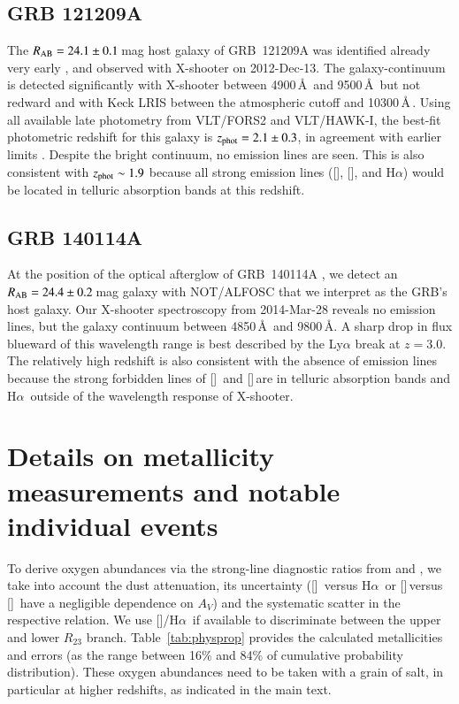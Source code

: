 \documentclass[traditabstract, longauth]{aa}
\newcommand{\ha}{H$\alpha$}
\newcommand{\oii}{[\ion{O}{ii}]}
\newcommand{\oiii}{[\ion{O}{iii}]}
\newcommand{\neiii}{[\ion{Ne}{iii}]}
\newcommand{\nii}{[\ion{N}{ii}]}
\begin{document}
\begin{appendix}
\subsection{GRB 121209A}

The $R_{\rm{AB}}=24.1\pm0.1$\,mag host galaxy of GRB~121209A \citep{2012GCN..14045...1M} was identified already very early \citep{2012GCN..14049...1K, 2012GCN..14056...1P}, and observed with X-shooter on 2012-Dec-13. The galaxy-continuum is detected significantly with X-shooter between 4900\,\AA\, and 9500\,\AA\, but not redward and with Keck LRIS between the atmospheric cutoff and 10300\,\AA\,\citep{2012GCN..14056...1P}. Using all available late photometry from VLT/FORS2 and VLT/HAWK-I, the best-fit photometric redshift for this galaxy is $z_{\rm{phot}} = 2.1\pm0.3$, in agreement with earlier limits \citep{2012GCN..14056...1P}. Despite the bright continuum, no emission lines are seen. This is also consistent with $z_{\rm{phot}}\sim1.9$ because all strong emission lines (\oiii, \oii, and \ha) would be located in telluric absorption bands at this redshift. 

\subsection{GRB 140114A}

At the position of the optical afterglow \citep{2014GCN..15732...1B, 2014GCN..15743...1C} of GRB~140114A \citep{2014GCN..15728...1T}, we detect an $R_{\rm{AB}}=24.4\pm0.2\,$mag galaxy with NOT/ALFOSC that we interpret as the GRB's host galaxy. Our X-shooter spectroscopy from 2014-Mar-28 reveals no emission lines, but the galaxy continuum between 4850\,\AA\, and 9800\,\AA. A sharp drop in flux blueward of this wavelength range is best described by the Ly$\alpha$ break at $z=3.0$. The relatively high redshift is also consistent with the absence of emission lines because the strong forbidden lines of \oii\, and \oiii\,are in telluric absorption bands and \ha\, outside of the wavelength response of X-shooter.

\section{Details on metallicity measurements and notable individual events}
\label{sec:metmeas}

To derive oxygen abundances via the strong-line diagnostic ratios from \citet{2006A&A...459...85N} and \citet{2008A&A...488..463M}, we take into account the dust attenuation, its uncertainty (\nii\, versus \ha\, or \neiii\,versus \oii\, have a negligible dependence on $A_V$) and the systematic scatter in the respective relation. We use \nii/\ha\, if available to discriminate between the upper and lower $R_{23}$ branch. Table~\ref{tab:physprop} provides the calculated metallicities and errors (as the range between 16\% and 84\% of cumulative probability distribution). These oxygen abundances need to be taken with a grain of salt, in particular at higher redshifts, as indicated in the main text. 


\end{appendix}
\end{document}
